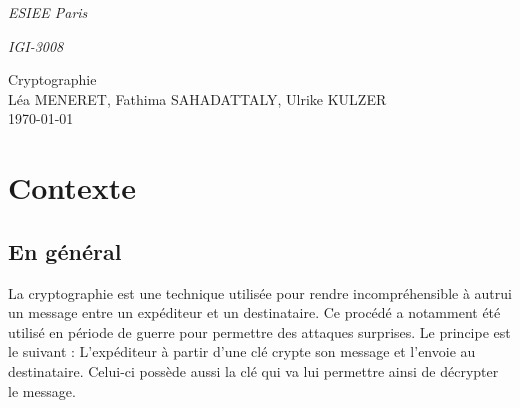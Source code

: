 \documentclass[a4paper,12pt,abstracton,titlepage]{scrartcl}
\begin{document}

{\Large\noindent \emph{ESIEE Paris}}

{\Large\noindent \emph{IGI-3008}}
\begin{center}
	{\large Cryptographie	 \\ \large Léa MENERET, Fathima SAHADATTALY, Ulrike KULZER \\ \today}
\end{center}

\setcounter{page}{1} %

\section{Contexte}
\subsection{En général}
La cryptographie est une technique utilisée pour rendre incompréhensible à autrui un message entre un expéditeur et un destinataire. Ce procédé a notamment été utilisé en période de guerre pour permettre des attaques surprises. 
Le principe est le suivant : L'expéditeur à partir d'une clé crypte son message et l'envoie au destinataire. Celui-ci possède aussi la clé qui va lui permettre ainsi de décrypter le message.
\end{document}
